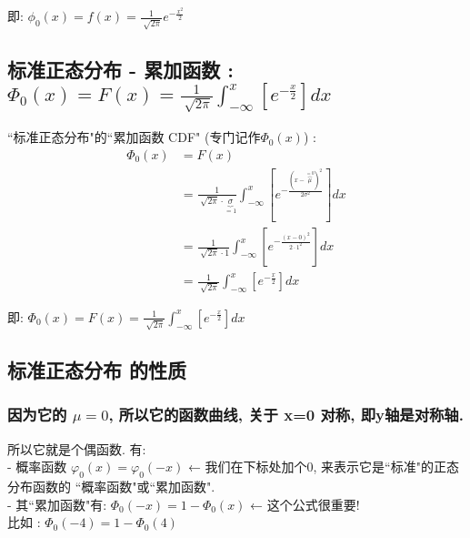 \documentclass[UTF8]{ctexart}
\begin{document}
即: 
 $\boxed{
	\phi _0(x)=f\left( x \right) =\frac{1}{\sqrt[]{2\pi}}e^{-\frac{x^2}{2}}		
}$


\vspace{1em} 
\subsection{标准正态分布 - 累加函数 :  $\boxed{
		\varPhi _0(x)=F\left( x \right) =\frac{1}{\sqrt[]{2\pi}}\int_{-\infty}^x{\left[ e^{-\frac{x}{2}} \right]}dx
	}$}
	

``标准正态分布"的``累加函数 CDF" (专门记作$\varPhi _0(x)$) :
\begin{align*}  %
	\varPhi _0(x) &=F\left( x \right)\\
&=\frac{1}{\sqrt[]{2\pi}\cdot \underset{=1}{\underbrace{\sigma }}}\int_{-\infty}^x{\left[ e^{-\frac{(x-\overset{=0}{\overbrace{\mu }})^2}{2\sigma ^2}} \right]}dx\\
&=\frac{1}{\sqrt[]{2\pi}\cdot 1}\int_{-\infty}^x{\left[ e^{-\frac{(x-0)^2}{2\cdot 1^2}} \right]}dx\\
&=\frac{1}{\sqrt[]{2\pi}}\int_{-\infty}^x{\left[ e^{-\frac{x}{2}} \right]}dx  
\end{align*}

即: $\boxed{
	\varPhi _0(x)=F\left( x \right) =\frac{1}{\sqrt[]{2\pi}}\int_{-\infty}^x{\left[ e^{-\frac{x}{2}} \right]}dx
}$





\vspace{1em} 
\subsection{标准正态分布 的性质}

\subsubsection{因为它的 $\mu=0$, 所以它的函数曲线, 关于 x=0 对称, 即y轴是对称轴.}

所以它就是个偶函数.  有: \\
- 概率函数 $ \varphi_0(x) = \varphi_0(-x) $   ← 我们在下标处加个0, 来表示它是``标准"的正态分布函数的 ``概率函数"或``累加函数". \\

- 其``累加函数"有: $\boxed{\varPhi _0(-x)=1-\varPhi _0(x)}$ ← 这个公式很重要! \\
比如 : $\varPhi _0(-4)=1-\varPhi _0(4)$ \\
\end{document}
